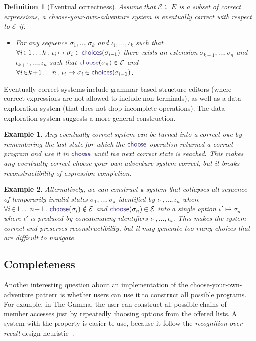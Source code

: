 \documentclass[nonacm,anonymous,sigplan,screen]{acmart}
\newcommand{\ident}[1]{\textsf{\color{DarkSlateBlue}{#1}}}
\newcommand{\select}{\textnormal{\ident{choose}}}
\newcommand{\choices}{\textnormal{\ident{choices}}}
\newtheorem{definition}{Definition}
\newtheorem{example}{Example}
\begin{document}
\begin{definition}[Eventual correctness]\label{def:eventual}
Assume that $\mathcal{E}\subseteq E$ is a subset of correct expressions,
a choose-your-own-adventure system is eventually correct with respect to $\mathcal{E}$ if:
\begin{itemize}
\item For any sequence $\sigma_1,\ldots,\sigma_k$ and $\iota_1,\ldots,\iota_k$ such that
  $\forall i\!\in\! 1\ldots k\;.\; \iota_i\mapsto\sigma_i \in \choices(\sigma_{i-1})$
  there exists an extension $\sigma_{k+1},\ldots,\sigma_n$ and $\iota_{k+1},\ldots,\iota_n$ such that
  $\select(\sigma_n) \in \mathcal{E}$ and
  $\forall i\!\in\! k\!+\!1\ldots n\;.\;\iota_i\mapsto\sigma_i \in \choices(\sigma_{i-1})$.
\end{itemize}
\end{definition}

Eventually correct systems include grammar-based structure editors (where correct
expressions are not allowed to include non-terminals), as well as a data exploration system
(that does not drop incomplete operations). The data exploration system suggests a more general
construction.

\begin{example} Any eventually correct system can be turned into a correct one by
  remembering the last state for which the $\select$ operation returned a correct program and use
  it in $\select$ until the next correct state is reached.
  This makes any eventually correct choose-your-own-adventure system correct, but it
  breaks reconstructibility of expression completion.
  \end{example}

\begin{example}
Alternatively, we can construct a system that collapses all sequence of temporarily invalid states
$\sigma_1, \ldots, \sigma_n$ identified by $\iota_1, \ldots, \iota_n$ where
$\forall i\!\in\! 1\ldots n\!-\! 1\;.\;\select(\sigma_i)\notin\mathcal{E}$ and $\select(\sigma_n)\in\mathcal{E}$
into a single option $\iota' \mapsto \sigma_n$ where $\iota'$ is produced by concatenating
identifiers $\iota_1,\ldots,\iota_n$.
This makes the system correct and preserves reconstructibility, but it may
generate too many choices that are difficult to navigate.
\end{example}

\subsection{Completeness}
Another interesting question about an implementation of the choose-your-own-adventure pattern is
whether users can use it to construct all possible programs. For example, in The Gamma, the user
can construct all possible chains of member accesses just by repeatedly choosing options from the
offered lists. A system with the property is easier to use, because it follow the
\emph{recognition over recall} design heuristic~\cite{nielsen-1994-usability}.
\end{document}
